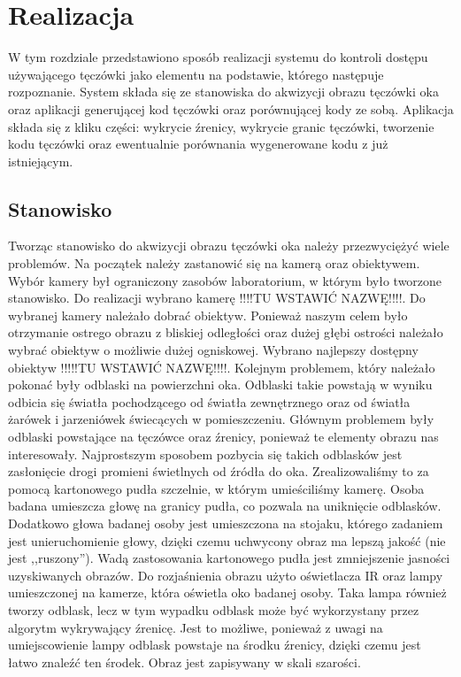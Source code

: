 \chapter{Realizacja}
\label{cha:realizacja}
W tym rozdziale przedstawiono sposób realizacji systemu do kontroli dostępu używającego tęczówki jako elementu na podstawie, którego następuje rozpoznanie. System składa się ze stanowiska do akwizycji obrazu tęczówki oka oraz aplikacji generującej kod tęczówki oraz porównującej kody ze sobą. Aplikacja składa się z kliku części: wykrycie źrenicy, wykrycie granic tęczówki, tworzenie kodu tęczówki oraz ewentualnie porównania wygenerowane kodu z już istniejącym.

\section{Stanowisko}
\label{sec:stanowisko}
Tworząc stanowisko do akwizycji obrazu tęczówki oka należy przezwyciężyć wiele problemów. Na początek należy zastanowić się na kamerą oraz obiektywem. Wybór kamery był ograniczony zasobów laboratorium, w którym było tworzone stanowisko. Do realizacji wybrano kamerę !!!!TU WSTAWIĆ NAZWĘ!!!!. Do wybranej kamery należało dobrać obiektyw. Ponieważ naszym celem było otrzymanie ostrego obrazu z bliskiej odległości oraz dużej głębi ostrości należało wybrać obiektyw o możliwie dużej ogniskowej. Wybrano najlepszy dostępny obiektyw !!!!!TU WSTAWIĆ NAZWĘ!!!!. Kolejnym problemem, który należało pokonać były odblaski na powierzchni oka. Odblaski takie powstają w wyniku odbicia się światła pochodzącego od światła zewnętrznego oraz od światła żarówek i jarzeniówek świecących w pomieszczeniu. Głównym problemem były odblaski powstające na tęczówce oraz źrenicy, ponieważ te elementy obrazu nas interesowały. Najprostszym sposobem pozbycia się takich odblasków jest zasłonięcie drogi promieni świetlnych od źródła do oka. Zrealizowaliśmy to za pomocą kartonowego pudła szczelnie, w którym umieściliśmy kamerę. Osoba badana umieszcza głowę na granicy pudła, co pozwala na uniknięcie odblasków. Dodatkowo głowa badanej osoby jest umieszczona na stojaku, którego zadaniem jest unieruchomienie głowy, dzięki czemu uchwycony obraz ma lepszą jakość (nie jest ,,ruszony''). Wadą zastosowania kartonowego pudła jest zmniejszenie jasności uzyskiwanych obrazów. Do rozjaśnienia obrazu użyto oświetlacza IR oraz lampy umieszczonej na kamerze, która oświetla oko badanej osoby. Taka lampa również tworzy odblask, lecz w tym wypadku odblask może być wykorzystany przez algorytm wykrywający źrenicę. Jest to możliwe, ponieważ z uwagi na umiejscowienie lampy odblask powstaje na środku źrenicy, dzięki czemu jest łatwo znaleźć ten środek. Obraz jest zapisywany w skali szarości.

